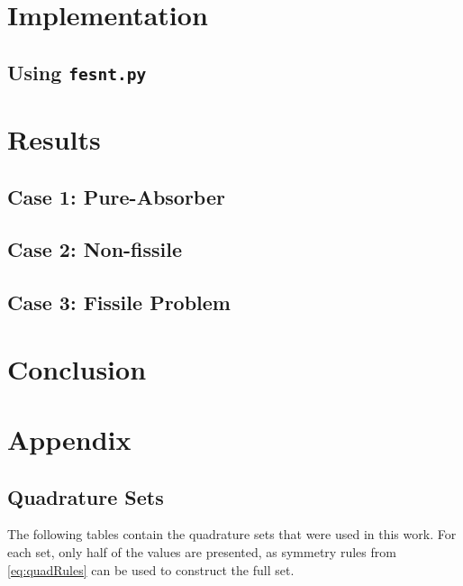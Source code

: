 \documentclass{article}
\begin{document}
\section{Implementation} \label{sec:implement}

\subsection{Using \texttt{fesnt.py}} \label{sec:usage}

\section{Results} \label{sec:results}

\subsection{Case 1: Pure-Absorber} \label{sec:pa}

\subsection{Case 2: Non-fissile} \label{sec:nonFissile}

\subsection{Case 3: Fissile Problem} \label{sec:fissile}

\section{Conclusion} 

\section{Appendix}

\subsection{Quadrature Sets} \label{sec:qsets}
The following tables contain the quadrature sets that were used in this work.
For each set, only half of the values are presented, as symmetry rules from \cref{eq:quadRules}
can be used to construct the full set.



\end{document}
